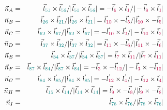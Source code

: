 \begin{enumerate}
\begin{eqnarray}
\vec{n}_A 
&=& \vec{l}_{\color{teal}51}\times\vec{l}_{\color{teal}56}/
   |\vec{l}_{\color{teal}51}\times\vec{l}_{\color{teal}56}|
= -\vec{l}_{\color{purple}9}\times\vec{l}_{\color{purple}1}/
| -\vec{l}_{\color{purple}9}\times\vec{l}_{\color{purple}1}| 
\nn\\
\vec{n}_B 
&=& \vec{l}_{\color{teal}26}\times\vec{l}_{\color{teal}21}/
   |\vec{l}_{\color{teal}26}\times\vec{l}_{\color{teal}21}|
= \vec{l}_{\color{purple}10}\times-\vec{l}_{\color{purple}5}/
 |\vec{l}_{\color{purple}10}\times-\vec{l}_{\color{purple}5}|  
\nn\\
\vec{n}_C 
&=& \vec{l}_{\color{teal}62}\times\vec{l}_{\color{teal}67}/
   |\vec{l}_{\color{teal}62}\times\vec{l}_{\color{teal}67}|   
= -\vec{l}_{\color{purple}10}\times\vec{l}_{\color{purple}2}/
 |-\vec{l}_{\color{purple}10}\times\vec{l}_{\color{purple}2}| 
\nn  \\
\vec{n}_D 
&=& \vec{l}_{\color{teal}37}\times\vec{l}_{\color{teal}32}/
   |\vec{l}_{\color{teal}37}\times\vec{l}_{\color{teal}32}|   
= \vec{l}_{\color{purple}11}\times-\vec{l}_{\color{purple}6}/
 |\vec{l}_{\color{purple}11}\times-\vec{l}_{\color{purple}6}|
\nn\\
\vec{n}_E
&=& \vec{l}_{\color{teal}34}\times\vec{l}_{\color{teal}37}/
   |\vec{l}_{\color{teal}34}\times\vec{l}_{\color{teal}37}|   
= \vec{l}_{\color{purple}7}\times\vec{l}_{\color{purple}11}/
 |\vec{l}_{\color{purple}7}\times\vec{l}_{\color{purple}11}|
\nn\\
\vec{n}_F
&=& \vec{l}_{\color{teal}87}\times\vec{l}_{\color{teal}84}/
   |\vec{l}_{\color{teal}87}\times\vec{l}_{\color{teal}84}|   
= -\vec{l}_{\color{purple}3}\times-\vec{l}_{\color{purple}12}/
 |-\vec{l}_{\color{purple}3}\times-\vec{l}_{\color{purple}12}|
\nn\\
\vec{n}_G
&=& \vec{l}_{\color{teal}84}\times\vec{l}_{\color{teal}85}/
   |\vec{l}_{\color{teal}84}\times\vec{l}_{\color{teal}85}|   
= -\vec{l}_{\color{purple}12}\times\vec{l}_{\color{purple}4}/
 |-\vec{l}_{\color{purple}12}\times\vec{l}_{\color{purple}4}|
\nn\\
\vec{n}_H
&=& \vec{l}_{\color{teal}15}\times\vec{l}_{\color{teal}14}/
   |\vec{l}_{\color{teal}14}\times\vec{l}_{\color{teal}14}|   
= \vec{l}_{\color{purple}9}\times-\vec{l}_{\color{purple}8}/
 |\vec{l}_{\color{purple}9}\times-\vec{l}_{\color{purple}8}|
\nn\\
\vec{n}_I
&=& \vec{l}_{\color{teal}78}\times\vec{l}_{\color{teal}76}/
   |\vec{l}_{\color{teal}78}\times\vec{l}_{\color{teal}76}|   

\end{eqnarray}
\end{enumerate}
